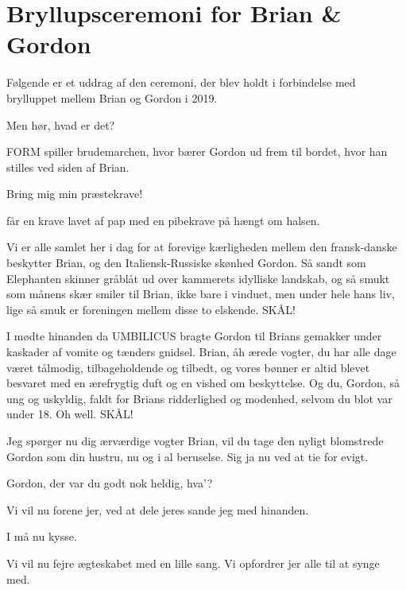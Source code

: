 \chapter{Bryllupsceremoni for Brian \& Gordon}
Følgende er et uddrag af den ceremoni, der blev holdt i forbindelse med brylluppet mellem Brian og Gordon i 2019.
\begin{Sketch}{}
	\vspace{-30pt}
	\begin{Replik}[\CERM]
		Men hør, hvad er det?
	\end{Replik}
	\begin{Regi}
		FORM spiller brudemarchen, hvor \VC bærer Gordon ud frem til bordet, hvor han stilles ved siden af Brian.
	\end{Regi}
	\begin{Replik}[\CERM]
 Bring mig min præstekrave!
	\end{Replik}
\begin{Regi}
 \CERM får en krave lavet af pap med en pibekrave på hængt om halsen.
\end{Regi}
 \begin{Replik}[\CERM]
Vi er alle samlet her i dag for at forevige kærligheden mellem den fransk-danske beskytter Brian, og den Italiensk-Russiske skønhed Gordon. Så sandt som Elephanten skinner gråblåt ud over kammerets idylliske landskab, og så smukt som månens skær smiler til Brian, ikke bare i vinduet, men under hele hans liv, lige så smuk er foreningen mellem disse to elskende. SKÅL!
\end{Replik}
\smallskip
\begin{Replik}[]
I mødte hinanden da UMBILICUS bragte Gordon til Brians gemakker under kaskader af vomite og tænders gnidsel. Brian, åh ærede vogter, du har alle dage været tålmodig, tilbageholdende og tilbedt, og vores bønner er altid blevet besvaret med en ærefrygtig duft og en vished om beskyttelse. Og du, Gordon, så ung og uskyldig, faldt for Brians ridderlighed og modenhed, selvom du blot var under 18. Oh well. SKÅL!
\end{Replik}
\smallskip
\begin{Replik}[]
Jeg spørger nu dig ærværdige vogter Brian, vil du tage den nyligt blomstrede Gordon som din hustru, nu og i al beruselse. Sig ja nu ved at tie for evigt. 
\end{Replik}
\begin{Replik}[]
	 Gordon, der var du godt nok heldig, hva’?
\end{Replik}
\begin{Replik}[]
Vi vil nu forene jer, ved at dele jeres sande jeg med hinanden. 
\end{Replik}
\begin{Replik}[]
I må nu kysse.
\end{Replik}
\begin{Replik}[]
Vi vil nu fejre ægteskabet med en lille sang. Vi opfordrer jer alle til at synge med. 
\end{Replik}
\end{Sketch}

